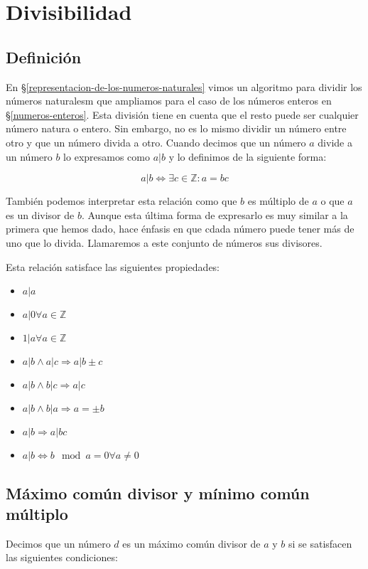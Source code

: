 \section{Divisibilidad}\label{divisibilidad}

\subsection{Definición}

En \S\ref{representacion-de-los-numeros-naturales} vimos un algoritmo para dividir los números naturalesm que ampliamos para el caso de los números enteros en \S\ref{numeros-enteros}.
Esta división tiene en cuenta que el resto puede ser cualquier número natura o entero.
Sin embargo, no es lo mismo dividir un número entre otro y que un número divida a otro.
Cuando decimos que un número $a$ divide a un número $b$ lo expresamos como $a|b$ y lo definimos de la siguiente forma:

\[a|b \iff \exists c \in\mathbb{Z} : a = bc\]

También podemos interpretar esta relación como que $b$ es múltiplo de $a$ o que $a$ es un divisor de $b$.
Aunque esta última forma de expresarlo es muy similar a la primera que hemos dado, hace énfasis en que cdada número puede tener más de uno que lo divida.
Llamaremos a este conjunto de números sus divisores.

Esta relación satisface las siguientes propiedades:

\begin{itemize}
	\item $a|a$
	\item $a|0 \forall a \in\mathbb{Z}$
	\item $1|a \forall a \in\mathbb{Z}$
	\item $a|b \land a|c \Rightarrow a|b \pm c$
	\item $a|b \land b|c \Rightarrow a|c$
	\item $a|b \land b|a \Rightarrow a = \pm b$
	\item $a|b \Rightarrow a|bc$
	\item $a|b \iff b \mod a = 0 \forall a \neq 0$
\end{itemize}

\subsection{Máximo común divisor y mínimo común múltiplo}

Decimos que un número $d$ es un máximo común divisor de $a$ y $b$ si se satisfacen las siguientes condiciones:

